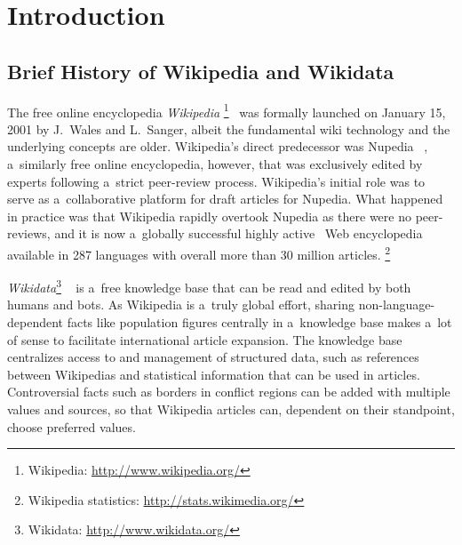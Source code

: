 \documentclass{sig-alternate-somus}
\newcommand{\inlinelistingsize}{\fontsize{8pt}{11pt}}
\let\oldurl\url
\renewcommand{\url}[1]{\inlinelistingsize\oldurl{#1}}
\begin{document}



\section{Introduction}
\label{sec:introduction}
\selectfont

\subsection{Brief History of Wikipedia and Wikidata}

The free online encyclopedia \emph{Wikipedia}%
\footnote{Wikipedia: \url{http://www.wikipedia.org/}}~\cite{sanger05historywikipedia} was formally launched
on January 15, 2001 by J.~Wales
and L.~Sanger,
albeit the fundamental wiki technology
and the underlying concepts are older.
Wikipedia's direct predecessor was Nupedia%
~\cite{sanger05historywikipedia},
a~similarly free online encyclopedia,
however, that was exclusively edited by experts
following a~strict peer-review process.
Wikipedia's initial role was to serve
as a~collaborative platform for draft articles for Nupedia.
What happened in practice was that Wikipedia
rapidly overtook Nupedia as there were no peer-reviews,
and it is now a~globally successful
highly active~\cite{steiner2013bots} Web encyclopedia
available in 287 languages with overall
more than 30 million articles.%
\footnote{Wikipedia statistics: \url{http://stats.wikimedia.org/}}

\emph{Wikidata}\footnote{Wikidata: \url{http://www.wikidata.org/}}%
~\cite{vrandecic2012wikidata}
is a~free knowledge base that can be read
and edited by both humans and bots.
As Wikipedia is a~truly global effort,
sharing non-language-dependent facts
like population figures centrally
in a~knowledge base makes a~lot of sense
to facilitate international article expansion.
The knowledge base centralizes access to
and management of structured data,
such as references between Wikipedias
and statistical information that can be used in articles.
Controversial facts such as borders in conflict regions
can be added with multiple values and sources,
so that Wikipedia articles can,
dependent on their standpoint, choose preferred values.
\end{document}
